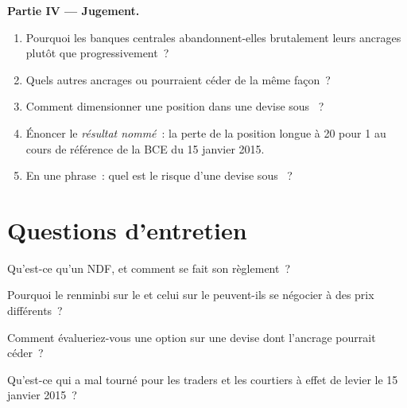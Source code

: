 \begin{problem}
\medskip\noindent\textbf{Partie IV --- Jugement.}
\begin{enumerate}[resume]
\item Pourquoi les banques centrales abandonnent-elles brutalement leurs ancrages plutôt que progressivement~?
\item Quels autres ancrages ou  pourraient céder de la même façon~?
\item Comment dimensionner une position dans une devise sous ~?
\item Énoncer le \emph{résultat nommé}~: la perte de la position longue à 20 pour 1 au cours
de référence de la BCE du 15 janvier 2015.
\item En une phrase~: quel est le risque d'une devise sous ~?
\end{enumerate}
\end{problem}

\section{Questions d'entretien}

\begin{interviewq}\label{iq:m2:emerging-market-fx-and-ndfs:1}
Qu'est-ce qu'un NDF, et comment se fait son règlement~?
\end{interviewq}

\begin{interviewq}\label{iq:m2:emerging-market-fx-and-ndfs:2}
Pourquoi le renminbi sur le  et celui sur le  peuvent-ils se négocier à des prix différents~?
\end{interviewq}

\begin{interviewq}\label{iq:m2:emerging-market-fx-and-ndfs:3}
Comment évalueriez-vous une option sur une devise dont l'ancrage pourrait céder~?
\end{interviewq}

\begin{interviewq}\label{iq:m2:emerging-market-fx-and-ndfs:4}
Qu'est-ce qui a mal tourné pour les traders et les courtiers à effet de levier le 15 janvier 2015~?
\end{interviewq}

